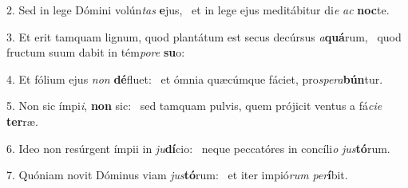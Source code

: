 2. Sed in lege Dómini volún\textit{tas} \textbf{e}jus, \ast\  et in lege ejus meditábitur di\textit{e} \textit{ac} \textbf{noc}te.\

3. Et erit tamquam lignum, quod plantátum est secus decúrsus \textit{a}\textbf{quá}rum, \ast\  quod fructum suum dabit in tém\textit{po}\textit{re} \textbf{su}o:\

4. Et fólium ejus \textit{non} \textbf{dé}fluet: \ast\  et ómnia quæcúmque fáciet, pro\textit{spe}\textit{ra}\textbf{bún}tur.\

5. Non sic ímpi\textit{i}, \textbf{non} sic: \ast\  sed tamquam pulvis, quem prójicit ventus a fá\textit{ci}\textit{e} \textbf{ter}ræ.\

6. Ideo non resúrgent ímpii in \textit{ju}\textbf{dí}cio: \ast\  neque peccatóres in concíli\textit{o} \textit{jus}\textbf{tó}rum.\

7. Quóniam novit Dóminus viam \textit{jus}\textbf{tó}rum: \ast\  et iter impió\textit{rum} \textit{per}\textbf{í}bit.\

